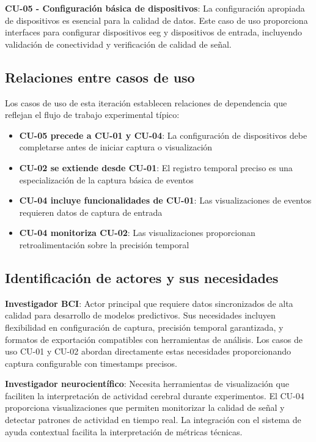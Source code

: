 \textbf{CU-05 - Configuración básica de dispositivos}: La configuración apropiada de dispositivos es esencial para la calidad de datos. Este caso de uso proporciona interfaces para configurar dispositivos \acrshort{eeg} y dispositivos de entrada, incluyendo validación de conectividad y verificación de calidad de señal.

\subsection{Relaciones entre casos de uso}
\label{subsec:relaciones_casos_uso_it1}

Los casos de uso de esta iteración establecen relaciones de dependencia que reflejan el flujo de trabajo experimental típico:

\begin{itemize}
    \item \textbf{CU-05 precede a CU-01 y CU-04}: La configuración de dispositivos debe completarse antes de iniciar captura o visualización
    \item \textbf{CU-02 se extiende desde CU-01}: El registro temporal preciso es una especialización de la captura básica de eventos
    \item \textbf{CU-04 incluye funcionalidades de CU-01}: Las visualizaciones de eventos requieren datos de captura de entrada
    \item \textbf{CU-04 monitoriza CU-02}: Las visualizaciones proporcionan retroalimentación sobre la precisión temporal
\end{itemize}

\subsection{Identificación de actores y sus necesidades}
\label{subsec:actores_necesidades_it1}

\textbf{Investigador BCI}: Actor principal que requiere datos sincronizados de alta calidad para desarrollo de modelos predictivos. Sus necesidades incluyen flexibilidad en configuración de captura, precisión temporal garantizada, y formatos de exportación compatibles con herramientas de análisis. Los casos de uso CU-01 y CU-02 abordan directamente estas necesidades proporcionando captura configurable con timestamps precisos.

\textbf{Investigador neurocientífico}: Necesita herramientas de visualización que faciliten la interpretación de actividad cerebral durante experimentos. El CU-04 proporciona visualizaciones que permiten monitorizar la calidad de señal y detectar patrones de actividad en tiempo real. La integración con el sistema de ayuda contextual facilita la interpretación de métricas técnicas.

